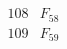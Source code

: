 \documentclass{article}
\begin{document}
{$$\begin{array}{|r|*{7}{r|}}
 & 
 & 
 & 
 & 
\\
\hline
108 
 & F_{58} &
 & 
 & 
 & 
 & 
 & 
\\
\hline
109 
 & F_{59} &
 & 
 & 
 & 
 & 
 & 

\end{array}$$}
\end{document}
